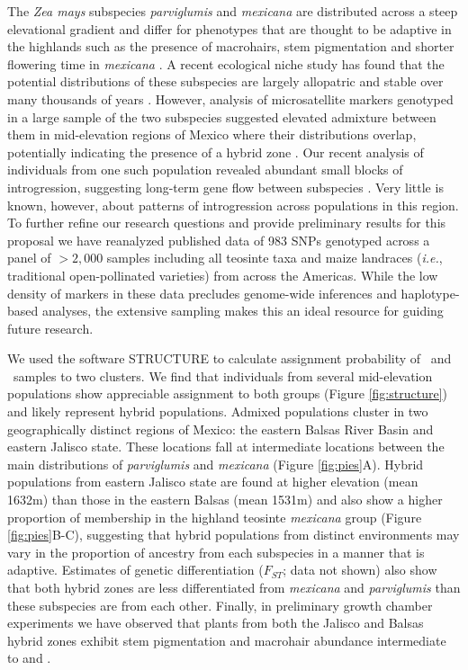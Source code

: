 The \emph {Zea mays} subspecies \emph{parviglumis} and \emph{mexicana} are distributed across a steep elevational gradient and differ for phenotypes that are thought to be adaptive in the highlands such as the presence of macrohairs, stem pigmentation and shorter flowering time in \emph{mexicana} \citep{wilkes1967teosinte}.
A recent ecological niche study has found that the potential distributions of these subspecies are largely allopatric and stable over many thousands of years \citep{hufford2012inferences}.
However, analysis of microsatellite markers genotyped in a large sample of the two subspecies suggested elevated admixture between them in mid-elevation regions of Mexico where their distributions overlap, potentially indicating the presence of a hybrid zone \citep{Fukunaga2005}.  
Our recent analysis of individuals from one such population revealed abundant small blocks of introgression, suggesting long-term gene flow between subspecies \citep{Pyhajarvi2013}.  
Very little is known, however, about patterns of introgression across populations in this region.
To further refine our research questions and provide preliminary results for this proposal we have reanalyzed published data \citep{Fang2012} of 983 SNPs genotyped across a panel of $>2,000$ samples including all teosinte taxa and maize landraces (\emph{i.e.}, traditional open-pollinated varieties) from across the Americas.
While the low density of markers in these data precludes genome-wide inferences and haplotype-based analyses, the extensive sampling makes this an ideal resource for guiding future research.

We used the software STRUCTURE \citep{Pritchard2000} to calculate assignment probability of \zp\ and \zm\ samples to two clusters.  
We find that individuals from several mid-elevation populations show appreciable assignment to both groups (Figure \ref{fig:structure}) and likely represent hybrid populations.  
Admixed populations cluster in two geographically distinct regions of Mexico: the eastern Balsas River Basin and eastern Jalisco state.
These locations fall at intermediate locations between the main distributions of \emph{parviglumis} and \emph{mexicana} (Figure \ref{fig:pies}A).
Hybrid populations from eastern Jalisco state are found at higher elevation (mean 1632m) than those in the eastern Balsas (mean 1531m) and also show a higher proportion of membership in the highland teosinte \emph{mexicana} group (Figure \ref{fig:pies}B-C), suggesting that hybrid populations from distinct environments may vary in the proportion of ancestry from each subspecies in a manner that is adaptive.
Estimates of genetic differentiation ($F_{ST}$; data not shown) also show that both hybrid zones are less differentiated from \emph{mexicana} and \emph{parviglumis} than these subspecies are from each other.
Finally, in preliminary growth chamber experiments we have observed that plants from both the Jalisco and Balsas hybrid zones exhibit stem pigmentation and macrohair abundance intermediate to \zp{} and \zm{}.


